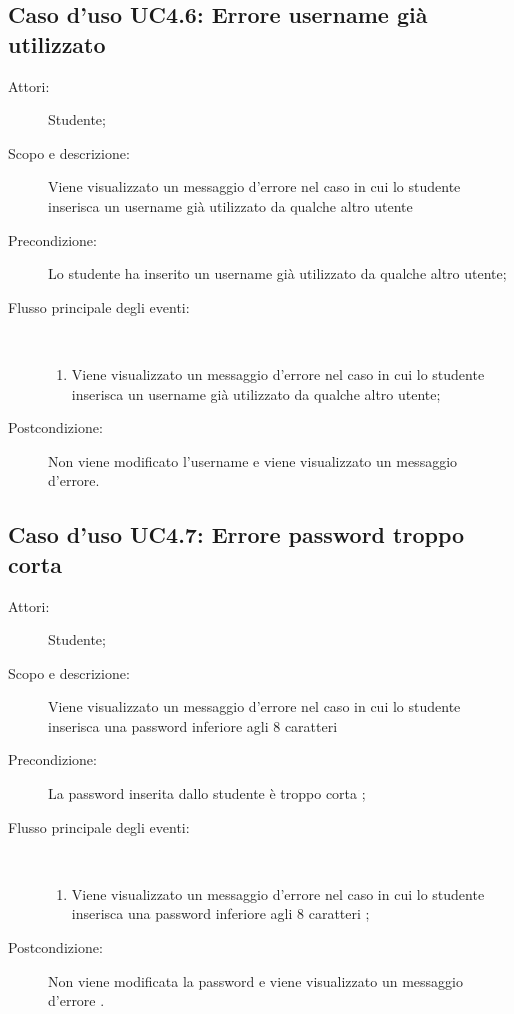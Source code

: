 \subsection{Caso d'uso UC4.6: Errore username già utilizzato}\begin{description}
	\item[Attori:] Studente;
	\item[Scopo e descrizione:] Viene visualizzato un messaggio d'errore nel caso in cui lo studente inserisca un username già utilizzato da qualche altro utente
	\item[Precondizione:] Lo studente ha inserito un username già utilizzato da qualche altro utente;
	
	\item[Flusso principale degli eventi:] \ 
	\begin{enumerate}
		\item Viene visualizzato un messaggio d'errore nel caso in cui lo studente inserisca un username già utilizzato da qualche altro utente;
		
	\end{enumerate}
	\item[Postcondizione:] Non viene modificato l'username e viene visualizzato un messaggio d'errore.
\end{description}
\hypertarget{UC4.7}{}
\subsection{Caso d'uso UC4.7: Errore password troppo corta}\begin{description}
	\item[Attori:] Studente;
	\item[Scopo e descrizione:] Viene visualizzato un messaggio d'errore nel caso in cui lo studente inserisca una password inferiore agli 8 caratteri
	
	\item[Precondizione:] La password inserita dallo studente è troppo corta
	;
	
	\item[Flusso principale degli eventi:] \ 
	\begin{enumerate}
		\item Viene visualizzato un messaggio d'errore nel caso in cui lo studente inserisca una password inferiore agli 8 caratteri	;
		
	\end{enumerate}
	\item[Postcondizione:] Non viene modificata la password e viene visualizzato un messaggio d'errore
	.
\end{description}
\hypertarget{UC5}{}
